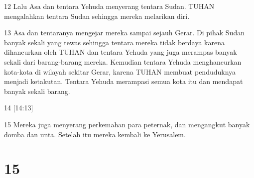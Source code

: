 \par 12 Lalu Asa dan tentara Yehuda menyerang tentara Sudan. TUHAN mengalahkan tentara Sudan sehingga mereka melarikan diri.
\par 13 Asa dan tentaranya mengejar mereka sampai sejauh Gerar. Di pihak Sudan banyak sekali yang tewas sehingga tentara mereka tidak berdaya karena dihancurkan oleh TUHAN dan tentara Yehuda yang juga merampas banyak sekali dari barang-barang mereka. Kemudian tentara Yehuda menghancurkan kota-kota di wilayah sekitar Gerar, karena TUHAN membuat penduduknya menjadi ketakutan. Tentara Yehuda merampasi semua kota itu dan mendapat banyak sekali barang.
\par 14 [14:13]
\par 15 Mereka juga menyerang perkemahan para peternak, dan mengangkut banyak domba dan unta. Setelah itu mereka kembali ke Yerusalem.

\chapter{15}

